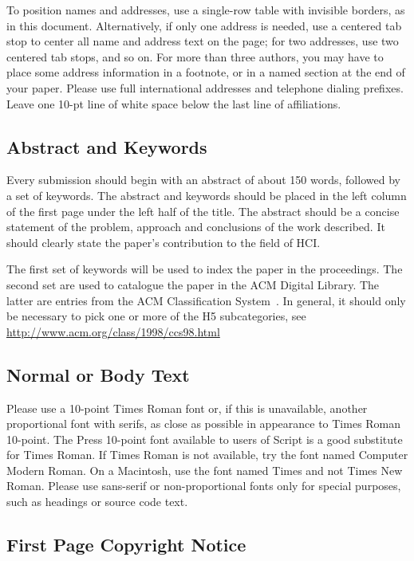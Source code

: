 \documentclass{chi2012}
\begin{document}
To position names and addresses, use a single-row table with invisible
borders, as in this document.  Alternatively, if only one address is
needed, use a centered tab stop to center all name and address text on
the page; for two addresses, use two centered tab stops, and so
on. For more than three authors, you may have to place some address
information in a footnote, or in a named section at the end of your
paper. Please use full international addresses and telephone dialing
prefixes.  Leave one 10-pt line of white space below the last line of
affiliations.

\subsection{Abstract and Keywords}

Every submission should begin with an abstract of about 150 words,
followed by a set of keywords. The abstract and keywords should be
placed in the left column of the first page under the left half of the
title. The abstract should be a concise statement of the problem,
approach and conclusions of the work described.  It should clearly
state the paper's contribution to the field of HCI.

The first set of keywords will be used to index the paper in the
proceedings. The second set are used to catalogue the paper in the ACM
Digital Library. The latter are entries from the ACM Classification
System~\cite{acm_categories}.  In general, it should only be necessary
to pick one or more of the H5 subcategories, see
\url{http://www.acm.org/class/1998/ccs98.html}

\subsection{Normal or Body Text}

Please use a 10-point Times Roman font or, if this is unavailable,
another proportional font with serifs, as close as possible in
appearance to Times Roman 10-point. The Press 10-point font available
to users of Script is a good substitute for Times Roman. If Times
Roman is not available, try the font named Computer Modern Roman. On a
Macintosh, use the font named Times and not Times New Roman. Please
use sans-serif or non-proportional fonts only for special purposes,
such as headings or source code text.

\subsection{First Page Copyright Notice}
\end{document}
